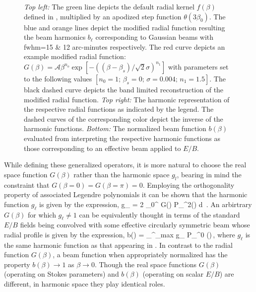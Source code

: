 \begin{figure}[!t] 
\centering
{}
\caption{\textit{Top left:} The green line depicts the default radial kernel $f(\beta)$ defined in , multiplied by an apodized step function $\theta(3 \beta_0)$. The blue and orange lines depict the modified radial function resulting the beam harmonics $b_{\ell}$ corresponding to Gaussian beams with fwhm=15 \& 12 arc-minutes respectively. The red curve depicts an example modified radial function: $G(\beta)=\mathcal{A} \beta^{n_o} \exp{\left[ -\left( {(\beta-\beta_s)}{/\sqrt{2} \sigma} \right)^{n_1} \right]}$ with parameters set to the following values $[n_0=1;\, \beta_s=0 ;\, \sigma = 0.004 ;\, n_1=1.5]$. The black dashed curve depicts the band limited reconstruction of the modified radial function. \textit{Top right:} The harmonic representation of the respective radial functions as indicated by the legend. The dashed curves of the corresponding color depict the inverse of the harmonic functions. \textit{Bottom:}  The normalized beam function $b(\beta)$ evaluated from interpreting the respective harmonic functions as those corresponding to an effective beam applied to $E/B$. }
\label{fig:example_gbeta}
\end{figure}
%

While defining these generalized operators, it is more natural to choose the real space function $G(\beta)$ rather than the harmonic space $g_l$, bearing in mind the constraint that $G(\beta=0)=G(\beta=\pi)=0$. Employing the orthogonality property of associated Legendre polynomials it can be shown that the harmonic function $g_{\ell}$ is given by the expression,
%
\beq
g_{\ell} = 2 \pi {} \int _{0}^{\pi} G(\beta) P_{\ell}^{2}(\cos{\beta}) d\cos{\beta} \,. \label{eq:gb2bl}
\eeq
%
An arbirtrary $G(\beta)$ for which $g_{\ell} \neq 1$ can be equivalently thought in terms of the standard $E/B$ fields being convolved with some effective circularly symmetric beam whose radial profile is given by the expression,
%
\beq
b(\beta) = \sum_{}^{\ell_{\rm max}}  g_{\ell} P_{\ell}^{0} (\cos{\beta})\,,
\eeq
%
where $g_{\ell}$ is the same harmonic function as that appearing in .
In contrast to the radial function $G(\beta)$, a beam function when appropriately normalized has the property $b(\beta) \rightarrow 1$ as $\beta \rightarrow 0$. Though the real space functions $G(\beta)$ (operating on Stokes parameters) and $b(\beta)$ (operating on scalar $E/B$) are different, in harmonic space they play identical roles.

